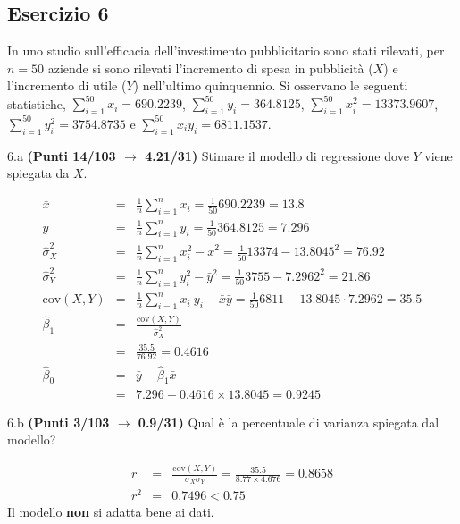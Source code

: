 \documentclass[
  11pt,
]{book}
\theoremstyle{mytheoremstyle}
\theoremstyle{mydefstyle}
\newenvironment{sol}
  {
  \begin{tcolorbox}[enhanced,breakable,arc=0.1mm,boxrule=1pt,colback=white,colframe=iblue,
  title=\bf \fontfamily{lmss}\selectfont \hspace{.5 cm} Soluzione,drop fuzzy shadow]

}{
\end{tcolorbox}
  }
\begin{document}
\subsection{Esercizio 6}\label{esercizio-6-24}

In uno studio sull'efficacia dell'investimento pubblicitario sono stati rilevati, per \(n=50\) aziende si sono rilevati l'incremento di spesa in
pubblicità (\(X\)) e l'incremento di utile (\(Y\)) nell'ultimo quinquennio. Si osservano le seguenti statistiche, \(\sum_{i=1}^{50}x_i=690.2239\), \(\sum_{i=1}^{50}y_i=364.8125\),
\(\sum_{i=1}^{50}x_i^2=13373.9607\), \(\sum_{i=1}^{50}y_i^2=3754.8735\) e \(\sum_{i=1}^{50}x_iy_i=6811.1537\).

6.a \textbf{(Punti 14/103 \(\rightarrow\) 4.21/31)} Stimare il modello di regressione dove \(Y\) viene spiegata da \(X\).

\begin{sol}
\begin{eqnarray*}
           \bar x &=&\frac 1 n\sum_{i=1}^n x_i = \frac {1}{ 50 }  690.2239 =  13.8 \\
           \bar y &=&\frac 1 n\sum_{i=1}^n y_i = \frac {1}{ 50 }  364.8125 =  7.296 \\
           \hat\sigma_X^2&=&\frac 1 n\sum_{i=1}^n x_i^2-\bar x^2=\frac {1}{ 50 }  13374  - 13.8045 ^2= 76.92 \\
           \hat\sigma_Y^2&=&\frac 1 n\sum_{i=1}^n y_i^2-\bar y^2=\frac {1}{ 50 }  3755  - 7.2962 ^2= 21.86 \\
           \text{cov}(X,Y)&=&\frac 1 n\sum_{i=1}^n x_i~y_i-\bar x\bar y=\frac {1}{ 50 }  6811 - 13.8045 \cdot 7.2962 = 35.5 \\
           \hat\beta_1 &=& \frac{\text{cov}(X,Y)}{\hat\sigma_X^2} \\
                    &=& \frac{ 35.5 }{ 76.92 }  =  0.4616 \\
           \hat\beta_0 &=& \bar y - \hat\beta_1 \bar x\\
                    &=&  7.296 - 0.4616 \times  13.8045 = 0.9245 
         \end{eqnarray*}

\end{sol}

6.b \textbf{(Punti 3/103 \(\rightarrow\) 0.9/31)} Qual è la percentuale di varianza spiegata dal modello?

\begin{sol}
\begin{eqnarray*}
r&=&\frac{\text{cov}(X,Y)}{\sigma_X\sigma_Y}=\frac{ 35.5 }{ 8.77 \times 4.676 }= 0.8658 \\r^2&=& 0.7496 < 0.75
\end{eqnarray*}
Il modello \textbf{non} si adatta bene ai dati.

\end{sol}
\end{document}
